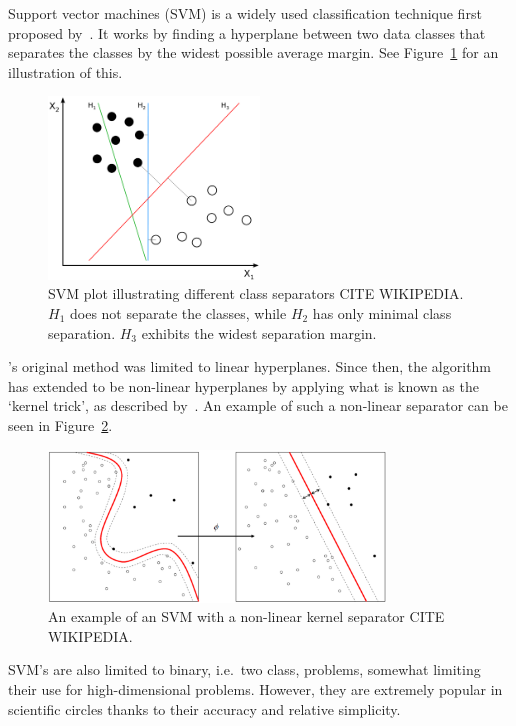 Support vector machines (SVM) is a widely used classification technique first proposed by~\cite{vapnik1995support}. It works by finding a hyperplane between two data classes that separates the classes by the widest possible average margin. See Figure~\ref{fig:chap2-svm-linear} for an illustration of this.

\begin{figure}
  \centering
  \includegraphics[width=0.5\textwidth]{figures/chapter2/svm_linear}
  \caption[SVM with linear hyperplane.]{SVM plot illustrating different class separators CITE WIKIPEDIA.\@$H_1$ does not separate the classes, while $H_2$ has only minimal class separation. $H_3$ exhibits the widest separation margin.}
\label{fig:chap2-svm-linear}
\end{figure}

\citeauthor{vapnik1995support}'s original method was limited to linear hyperplanes. Since then, the algorithm has extended to be non-linear hyperplanes by applying what is known as the `kernel trick', as described by~\cite{amari1999improving}. An example of such a non-linear separator can be seen in Figure~\ref{fig:chap2-svm-nonlinear}.

\begin{figure}
  \centering
  \includegraphics[width=0.8\textwidth]{figures/chapter2/svm_nonlinear}
  \caption{An example of an SVM with a non-linear kernel separator CITE WIKIPEDIA.}
\label{fig:chap2-svm-nonlinear}
\end{figure}

SVM's are also limited to  binary, i.e.\ two class, problems, somewhat limiting their use for high-dimensional problems. However, they are extremely popular in scientific circles thanks to their accuracy and relative simplicity. 

